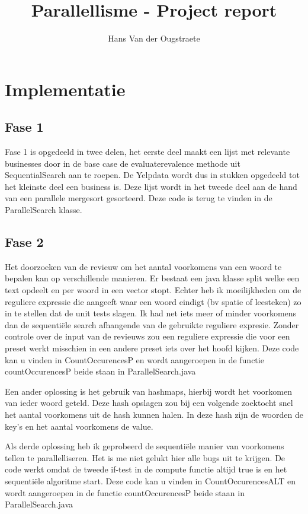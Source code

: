 \documentclass[]{article}
\title{Parallellisme - Project report}
\author{Hans Van der Ougstraete}
\begin{document}
\maketitle
\clearpage
\tableofcontents
\clearpage

\section{Implementatie}

\subsection{Fase 1}
Fase 1 is opgedeeld in twee delen, het eerste deel maakt een lijst met relevante businesses door in de base case de evaluaterevalence methode uit SequentialSearch aan te roepen. De Yelpdata wordt dus in stukken opgedeeld tot het kleinste deel een business is. Deze lijst wordt in het tweede deel aan de hand van een parallele mergesort gesorteerd. Deze code is terug te vinden in de ParallelSearch klasse.
\subsection{Fase 2}
Het doorzoeken van de revieuw om het aantal voorkomens van een woord te bepalen kan op verschillende manieren.
Er bestaat een java klasse split welke een text opdeelt en per woord in een vector stopt. Echter heb ik moeilijkheden om de reguliere expressie die aangeeft waar een woord eindigt (bv spatie of leesteken) zo in te stellen dat de unit tests slagen. Ik had net iets meer of minder voorkomens dan de sequentiële search afhangende van de gebruikte reguliere expresie. Zonder controle over de input van de revieuws zou een reguliere expressie die voor een preset werkt misschien in een andere preset iets over het hoofd kijken. Deze code kan u vinden in CountOccurencesP en wordt aangeroepen in de functie countOccurencesP beide staan in ParallelSearch.java

Een ander oplossing is het gebruik van hashmaps, hierbij wordt het voorkomen van ieder woord geteld. Deze hash opslagen zou bij een volgende zoektocht snel het aantal voorkomens uit de hash kunnen halen. In deze hash zijn de woorden de key's en het aantal voorkomens de value.

Als derde oplossing heb ik geprobeerd de sequentiële manier van voorkomens tellen te parallelliseren. Het is me niet gelukt hier alle bugs uit te krijgen.
De code werkt omdat de tweede if-test in de compute functie altijd true is en het sequentiële algoritme start.
Deze code kan u vinden in CountOccurencesALT en wordt aangeroepen in de functie countOccurencesP beide staan in ParallelSearch.java
\end{document}
